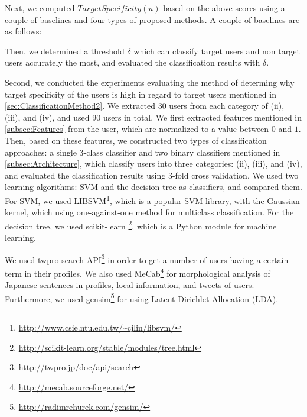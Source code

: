 Next, we computed $\mathit{TargetSpecificity}(u)$
based on the above scores using a couple of baselines and four types of
proposed methods.  A couple of baselines are as follows:




Then, we
determined a threshold $\delta$ which can classify target users and
non target users accurately the most, and evaluated the classification
results with $\delta$.

Second, we conducted the experiments evaluating the method of determing
why target specificity of the users is high in regard to target
users mentioned in \ref{sec:ClassificationMethod2}.  We extracted 30 users
from each category of (ii), (iii), and (iv), and used 90 users
in total.  We first extracted features mentioned in
\ref{subsec:Features} from the user, which are normalized to a
value between $0$ and $1$.  Then, based on these features, we
constructed two types of classification approaches: a single 3-class
classifier and
two binary classifiers mentioned in \ref{subsec:Architecture}, which
classify users into three categories:
(ii), (iii), and (iv), and evaluated the classification results using
3-fold cross validation.  We used two learning algorithms: SVM and the
decision tree as classifiers, and compared them.  For SVM, we used
LIBSVM\footnote{\url{http://www.csie.ntu.edu.tw/~cjlin/libsvm/}}, which
is a popular SVM library, with the Gaussian kernel, which using
one-against-one method for multiclass classification.  For the decision
tree, we used scikit-learn
\footnote{\url{http://scikit-learn.org/stable/modules/tree.html}}, which
is a Python module for machine learning.

We used twpro search API\footnote{\url{http://twpro.jp/doc/api/search}}
in order to get a number of users having a certain term in their
profiles.  We also used
MeCab\footnote{\url{http://mecab.sourceforge.net/}} for morphological
analysis of Japanese sentences in profiles, local information, and
tweets of users.  Furthermore, we used
gensim\footnote{\url{http://radimrehurek.com/gensim/}} for using Latent
Dirichlet Allocation (LDA).

